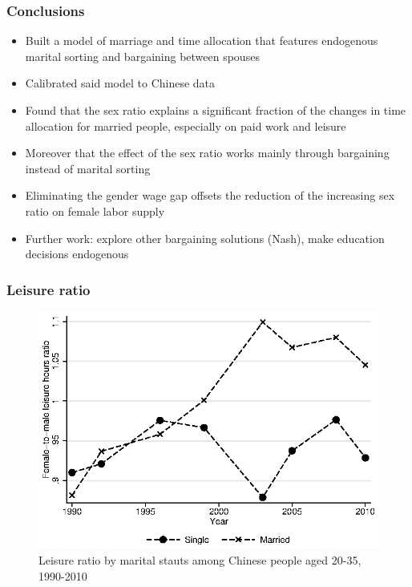 \documentclass{beamer}
\begin{document}
\begin{frame}
	\frametitle{Conclusions}
	\begin{itemize}
		\item Built a model of marriage and time allocation that features endogenous marital sorting and bargaining between spouses
		\item Calibrated said model to Chinese data 
		\item Found that the sex ratio explains a significant fraction of the changes in time allocation for married people, especially on paid work and leisure
		\item Moreover that the effect of the sex ratio works mainly through bargaining instead of marital sorting
		\item Eliminating the gender wage gap offsets the reduction of the increasing sex ratio on female labor supply
		\item Further work: explore other bargaining solutions (Nash), make education decisions endogenous
	\end{itemize}
\end{frame}

\appendix

\begin{frame}[noframenumbering]
	\frametitle{Leisure ratio}\label{appendix:leisure_ratio}
	\begin{figure}
		\centering
		\caption{Leisure ratio by marital stauts among Chinese people aged 20-35, 1990-2010}
		\includegraphics[width=.6\textwidth]{leisure_ratio_all}
	\end{figure}
	\hyperlink{frame:time_allocation}{}
\end{frame}
\end{document}
